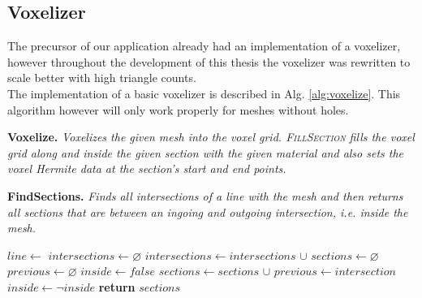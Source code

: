 \subsection{Voxelizer}
\label{sec:voxelizer}

The precursor of our application already had an implementation of a voxelizer, however throughout the development of this thesis
the voxelizer was rewritten to scale better with high triangle counts.\\
The implementation of a basic voxelizer is described in Alg. \ref{alg:voxelize}. This algorithm however will only work properly
for meshes without holes.


\begin{algorithm}[H]
\caption{\textbf{Voxelize.} \textit{Voxelizes the given mesh into the voxel grid. \textsc{FillSection} fills the voxel grid along and inside the given section with the given material and also sets the voxel Hermite data at the section's start and end points.}}\label{alg:voxelize}
\begin{algorithmic}[1]
				\State {} 
			\EndFor
		\EndFor
	\EndFor
\EndProcedure
\end{algorithmic}
\end{algorithm}

\begin{algorithm}[H]
\caption{\textbf{FindSections.} \textit{Finds all intersections of a line with the mesh and then returns all sections that are between an ingoing and outgoing intersection, i.e. inside the mesh.}}\label{alg:find_sections}
\begin{algorithmic}[1]
	\State $line \gets$ 
	\State $intersections \gets \varnothing$
		\State $intersections \gets intersections$ $\cup$ 
	\EndFor
	\State {}
	\State $sections \gets \varnothing$
	\State $previous \gets \varnothing$
	\State $inside \gets false$
			\State $sections \gets sections$ $\cup$ 
		\EndIf
		\State $previous \gets intersection$
		\State $inside \gets \neg inside$
	\EndFor
	\State \textbf{return} $sections$
\EndProcedure
\end{algorithmic}
\end{algorithm}

